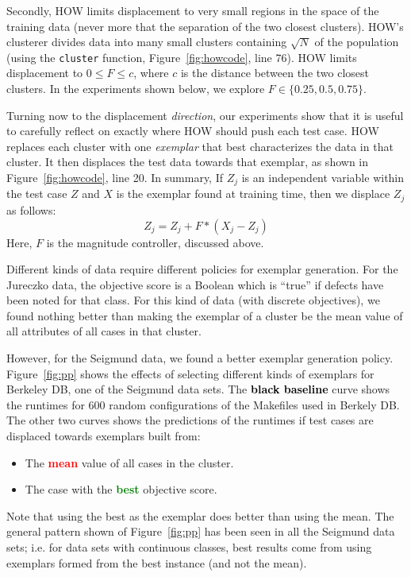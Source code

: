\documentclass[conference]{IEEEtran}
\newcommand{\bi}{\begin{itemize}}
\newcommand{\ei}{\end{itemize}}
\newcommand{\fig}[1]{Figure~\ref{fig:#1}}
\begin{document}
Secondly, HOW   limits displacement
to very small regions in the space of the training data (never more that the separation
of the two closest clusters).  HOW's clusterer divides  data into many   small clusters containing
$\sqrt{N}$ of the population (using the {\tt cluster} function, \fig{howcode}, line 76).
HOW   limits displacement to  \mbox{$0 \le F \le c$}, where
$c$ is the distance between the two closest clusters. 
In  the experiments shown below,  we explore
\mbox{$F\in \{0.25, 0.5, 0.75\}$}.

Turning now to the displacement {\em direction},
our experiments show that it is useful to  carefully reflect on exactly where HOW should  push each test case.
HOW replaces each cluster   with one {\em exemplar} that best
characterizes the data in that cluster. It then displaces the
test data towards that exemplar, as shown in \fig{howcode}, line 20. In summary, 
If  $Z_j$ is an independent variable within the
test case $Z$ and  $X$ is the exemplar found at training time,
then we displace $Z_j$ as follows:
\[Z_j =  Z_j + F*(X_j - Z_j)\]
Here, $F$ is the  magnitude controller, discussed above. 

Different kinds of data require
different policies for exemplar generation.
For the Jureczko data, the objective score
is a Boolean which is  ``true'' if defects have been noted
for that class.  For this kind of data (with discrete objectives),
we found nothing better than  making the exemplar of a cluster be the mean
value of all attributes of all cases in that cluster.

However, for the Seigmund data, we found a better exemplar generation policy.
\fig{pp} shows the effects of selecting different kinds of exemplars for 
Berkeley DB, one of the Seigmund data sets.
The \textcolor{black}{\bf black baseline} curve  shows the runtimes for 600 random configurations
of the Makefiles used in Berkely DB. The other two curves shows the predictions of the runtimes if test cases are displaced towards exemplars
  built from:
\bi
\item The \textcolor{red}{\bf   mean}    value of all cases in the  cluster.
\item The  case with the \textcolor{green}{\bf  best}  objective score. 
\ei
Note that using the best as the exemplar does better than using the mean.
The general pattern shown of \fig{pp} has been seen in all the Seigmund data sets;
i.e. for data sets with continuous classes,
best results come from using exemplars formed from the best instance (and not the mean). 
\end{document}
